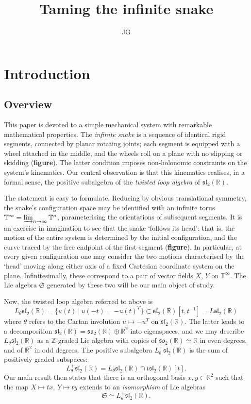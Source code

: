 \documentclass{article}
\title{Taming the infinite snake}
\author{JG}
\def\fsl{\mathfrak{sl}}
\def\fso{\mathfrak{so}}
\def\fS{\mathfrak{S}}
\def\ZZ{\mathbb{Z}}
\def\RR{\mathbb{R}}
\def\TT{\mathbb{T}}
\theoremstyle{definition}
\begin{document}
\sloppy\maketitle

\section{Introduction}
\label{sec:intro}
\subsection{Overview}
This paper is devoted to a simple mechanical
system with remarkable mathematical properties.
The \emph{infinite snake} is a sequence of 
identical rigid segments, connected by
planar rotating joints; each segment is
equipped with a wheel attached in the middle,
and the wheels roll 
on a plane with no slipping
or skidding (\textbf{figure}). The latter condition 
imposes non-holonomic constraints on the system's kinematics.
Our central observation is that
this kinematics realises, in a formal sense, the positive
subalgebra of the 
\emph{twisted loop algebra} of $\fsl_2(\RR)$. 

The statement is easy to formulate. Reducing by obvious translational
symmetry, the snake's configuration space may be identified with an
infinite torus $\TT^\infty = \varinjlim_{n\to\infty} \TT^n$, parameterising
the orientations of subsequent segments.
It is an exercise in imagination to see that the snake `follows its head':
that is, the motion of the entire system is determined by the initial configuration,
and the curve traced by the free endpoint of the first segment (\textbf{figure}). 
In particular, at every given configuration one may consider the two motions characterised
by the `head' moving along either axis of a fixed Cartesian coordinate system on the plane.
Infinitesimally, these correspond to a pair of vector fields $X$, $Y$ on $\TT^\infty$.
The Lie algebra $\fS$ generated by these two will be our main object of study.

Now, the twisted loop algebra referred to above is
$$
L_\theta\fsl_2(\RR) = \{ u(t)\ |\ u(-t)=-u(t)^T \} \subset \fsl_2(\RR)[t,t^{-1}] = L\fsl_2(\RR)
$$
where $\theta$ refers to the Cartan involution $u \mapsto -u^T$ on $\fsl_2(\RR)$.
The latter leads to a decomposition $\fsl_2(\RR) = \fso_2(\RR) \oplus \RR^2$ into eigenspaces,
and we may describe $L_\theta\fsl_2(\RR)$ as a $\ZZ$-graded Lie algebra with copies of 
$\fso_2(\RR)\simeq\RR$ in even degrees, and of $\RR^2$ in odd degrees.
The positive subalgebra $L_\theta^+\fsl_2(\RR)$ is the sum of positively graded subspaces:
$$
L_\theta^+\fsl_2(\RR) = L_\theta\fsl_2(\RR) \cap t \fsl_2(\RR)[t].
$$
Our main result then states that there is an orthogonal
basis $x,y\in\RR^2$ such that the map $X\mapsto tx$, $Y\mapsto ty$
extends to an \emph{isomorphism} of Lie algebras
$$\fS \simeq L_\theta^+\fsl_2(\RR). $$
\end{document}
